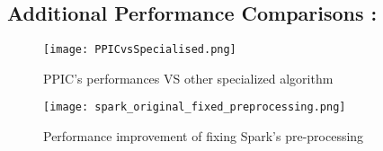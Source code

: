 \documentclass{eplmastersthesis}
\begin{document}
\subsection{Additional Performance Comparisons :}

\begin{figure}[h]
  \centering
  \texttt{[image: PPICvsSpecialised.png]}
  \caption{PPIC's performances VS other specialized algorithm}
  \label{PPIC's perfomance against other specialized implementations}
\end{figure}

\begin{figure}[h]
  \centering
  \texttt{[image: spark\_original\_fixed\_preprocessing.png]}
  \caption{Performance improvement of fixing Spark's pre-processing}
  \label{spark_preprocessing_fix}
\end{figure}
\end{document}
